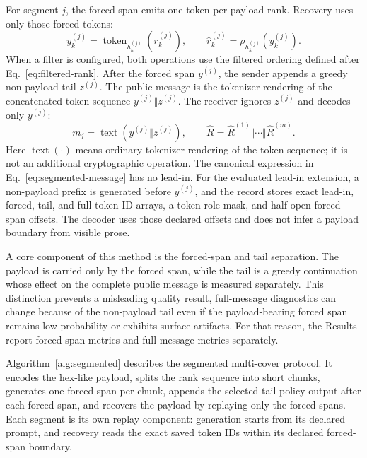 \documentclass[fleqn,10pt]{wlscirep}
\begin{document}
For segment \(j\), the forced span emits one token per payload rank. Recovery uses only those forced tokens:
\begin{equation}
y^{(j)}_k=
\operatorname{token}_{h^{(j)}_k}\left(r^{(j)}_k\right),
\qquad
\hat r^{(j)}_k=
\rho_{h^{(j)}_k}\left(y^{(j)}_k\right).
\label{eq:segmented-forced-span}
\end{equation}
When a filter is configured, both operations use the filtered ordering defined after Eq.~\eqref{eq:filtered-rank}. After the forced span \(y^{(j)}\), the sender appends a greedy non-payload tail \(z^{(j)}\). The public message is the tokenizer rendering of the concatenated token sequence \(y^{(j)}\Vert z^{(j)}\). The receiver ignores \(z^{(j)}\) and decodes only \(y^{(j)}\):
\begin{equation}
m_j=\operatorname{text}\left(y^{(j)}\Vert z^{(j)}\right),
\qquad
\hat R=\hat R^{(1)}\Vert\cdots\Vert\hat R^{(m)}.
\label{eq:segmented-message}
\end{equation}
Here \(\operatorname{text}(\cdot)\) means ordinary tokenizer rendering of the token sequence; it is not an additional cryptographic operation. The canonical expression in Eq.~\eqref{eq:segmented-message} has no lead-in. For the evaluated lead-in extension, a non-payload prefix is generated before \(y^{(j)}\), and the record stores exact lead-in, forced, tail, and full token-ID arrays, a token-role mask, and half-open forced-span offsets. The decoder uses those declared offsets and does not infer a payload boundary from visible prose.

A core component of this method is the forced-span and tail separation. The payload is carried only by the forced span, while the tail is a greedy continuation whose effect on the complete public message is measured separately. This distinction prevents a misleading quality result, full-message diagnostics can change because of the non-payload tail even if the payload-bearing forced span remains low probability or exhibits surface artifacts. For that reason, the Results report forced-span metrics and full-message metrics separately.

Algorithm~\ref{alg:segmented} describes the segmented multi-cover protocol. It encodes the hex-like payload, splits the rank sequence into short chunks, generates one forced span per chunk, appends the selected tail-policy output after each forced span, and recovers the payload by replaying only the forced spans. Each segment is its own replay component: generation starts from its declared prompt, and recovery reads the exact saved token IDs within its declared forced-span boundary.
\end{document}
